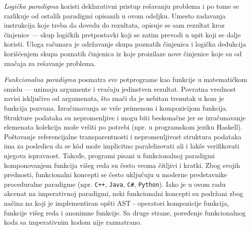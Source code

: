 \emph{Logička paradigma} koristi deklarativni pristup rešavanju problema i po tome se razlikuje od ostalih paradigmi opisanih u ovom odeljku. Umesto zadavanja instrukcija koje treba da dovedu do rezultata, opisuje se sam rezultat kroz činjenice --- skup logičkih pretpostavki koji se zatim prevodi u upit koji se dalje koristi. Uloga računara je održavanje skupa poznatih činjenica i logička dedukcija korišćenjem skupa poznatih činjenica iz koje proizilaze nove činjenice koje su od značaja za rešavanje problema. 

\emph{Funkcionalna paradigma} posmatra sve potprograme kao funkcije u matematičkom smislu --- uzimaju argumente i vraćaju jedinstven rezultat. Povratna vrednost zavisi isključivo od argumenata, što znači da je nebitan trenutak u kom je funkcija pozvana. Izračunavanja se vrše primenom i kompozicijom funkcija. Strukture podataka su nepromenljive i mogu biti beskonačne jer se izračunavanje elemenata kolekcija može vršiti po potrebi (npr. u programskom jeziku Haskell). Poštovanje referencijalne transparentnosti i nepromenljivost struktura podataka ima za posledicu da se k\^od može implicitno paralelizovati ali i lakše verifikovati njegova ispravnost. Takođe, programi pisani u funkcionalnoj paradigmi komponovanjem funkcija višeg reda su često veoma čitljivi i kratki. Zbog svojih prednosti, funkcionalni koncepti se često uključuju u moderne predstavnike proceduralne paradigme (npr. \texttt{C++}, \texttt{Java}, \texttt{C\#}, \texttt{Python}). Iako je u ovom radu akcenat na imperativnoj paradigmi, neki funkcionalni koncepti su podržani zbog načina na koji je implementiran opšti AST - operatori kompozicije funkcija, funkcije višeg reda i anonimne funkcije. Sa druge strane, poređenje funkcionalnog koda sa imperativnim kodom nije razmatrano. 
